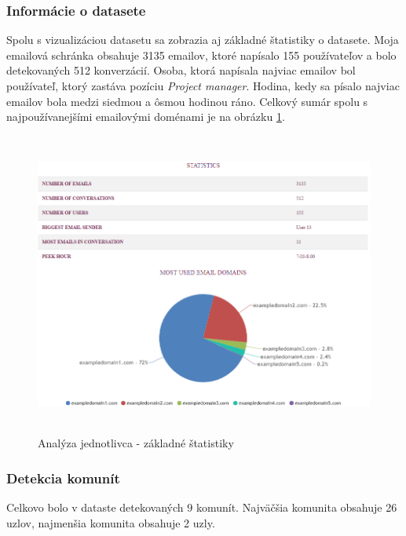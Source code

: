 \documentclass[slovak,master,public,dept460,male,cpdeclaration,oneside]{diploma}
\begin{document}
\subsubsection{Informácie o datasete}
Spolu s vizualizáciou datasetu sa zobrazia aj základné štatistiky o datasete. Moja emailová schránka obsahuje 3135 emailov, ktoré napísalo 155 používateľov a bolo detekovaných 512 konverzácií. Osoba, ktorá napísala najviac emailov bol používateľ, ktorý zastáva pozíciu \textit{Project manager}. Hodina, kedy sa písalo najviac emailov bola medzi siedmou a ôsmou hodinou ráno. Celkový sumár spolu s najpoužívanejšími emailovými doménami je na obrázku \ref{analyza_jednotlivca_stat}.

\begin{figure}[H]
\centering
\includegraphics[width=13cm, height=10cm]{figures/analyza_jednotlivca_stat}
\caption{Analýza jednotlivca - základné štatistiky}
\label{analyza_jednotlivca_stat}
\end{figure}


\subsubsection{Detekcia komunít}
Celkovo bolo v dataste detekovaných 9 komunít. Najväčšia komunita obsahuje 26 uzlov, najmenšia komunita obsahuje 2 uzly. 
\end{document}
